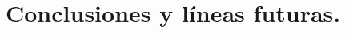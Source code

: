 \documentclass[11pt,a4paper,twoside,openright]{report}
\author{Nombre y Apellidos}
\begin{document}
\chapter{Conclusiones y líneas futuras.}


\section{}


%
%
\end{document}
